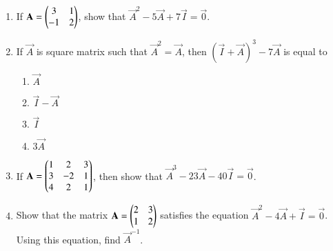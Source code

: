 \begin{enumerate}[label=\thesubsection.\arabic*,ref=\thesubsection.\theenumi]
\item If $\mathbf{A}=\begin{pmatrix}3 & 1\\ -1 & 2\end{pmatrix}$, show that $\vec{A}^2-5\vec{A}+7\vec{I}=\vec{0}$.
\item If $\vec{A}$ is square matrix such that $\vec{A}^2=\vec{A}$, then $(\vec{I}+\vec{A})^3-7\vec{A}$ is equal to
\begin{enumerate}
\item $\vec{A}$
\item $\vec{I}-\vec{A}$
\item $\vec{I}$
\item $3\vec{A}$
\end{enumerate}
\item If $\mathbf{A}=\begin{pmatrix}1&2&3\\3&-2&1\\4&2&1\end{pmatrix}$, then show that $\vec{A}^3-23\vec{A}-40\vec{I}=\vec{0}$.
\item Show that the matrix $\mathbf{A}=\begin{pmatrix}2&3 \\1&2\end{pmatrix}$ satisfies the equation $\vec{A}^2-4\vec{A}+\vec{I}=\vec{0}$. Using this equation, find $\vec{A}^{-1}$.
\end{enumerate}
